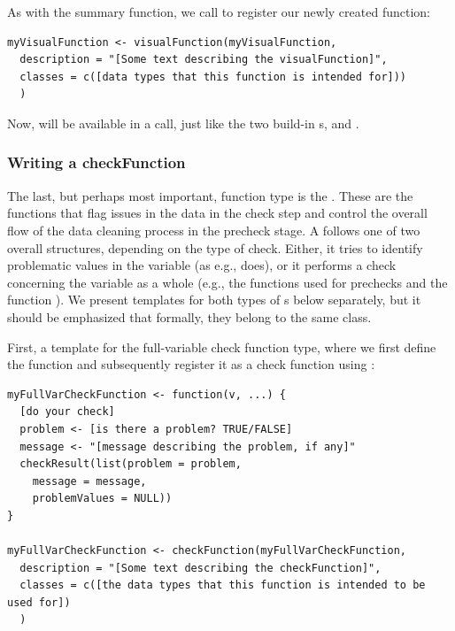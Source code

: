 \documentclass[article,shortnames]{jss}
\begin{document}
As with the summary function, we call  to
register our newly created function:
\begin{Verbatim}
myVisualFunction <- visualFunction(myVisualFunction,
  description = "[Some text describing the visualFunction]",
  classes = c([data types that this function is intended for]))
  )
\end{Verbatim}

Now,  will be available in a 
call, just like the two build-in s, 
and .

\subsubsection{Writing a checkFunction}
The last, but perhaps most important,  function type is
the . These are the functions that flag issues in
the data in the check step and control the overall flow of the data
cleaning process in the precheck stage. A  follows
one of two overall structures, depending on the type of check. Either,
it tries to identify problematic values in the variable (as
e.g.,  does), or it performs a check concerning the
variable as a whole (e.g., the functions used for prechecks and the
function ). We present templates for both types of
s below separately, but it should be emphasized that
formally, they belong to the same class.

First, a template for the full-variable check function type, where we
first define the function and subsequently register it as a check
function using :
\begin{Verbatim}
myFullVarCheckFunction <- function(v, ...) {
  [do your check]
  problem <- [is there a problem? TRUE/FALSE]
  message <- "[message describing the problem, if any]"
  checkResult(list(problem = problem,
    message = message,
    problemValues = NULL))
}

myFullVarCheckFunction <- checkFunction(myFullVarCheckFunction,
  description = "[Some text describing the checkFunction]",
  classes = c([the data types that this function is intended to be used for])
  )
\end{Verbatim}
\end{document}
